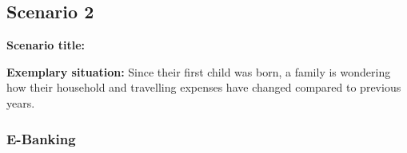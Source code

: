 
\subsection{Scenario 2}

\textbf{Scenario title:} \scentwo

\textbf{Exemplary situation:} Since their first child was born, a family is wondering how their household and travelling expenses have changed compared to previous years.



\subsubsection{E-Banking}


